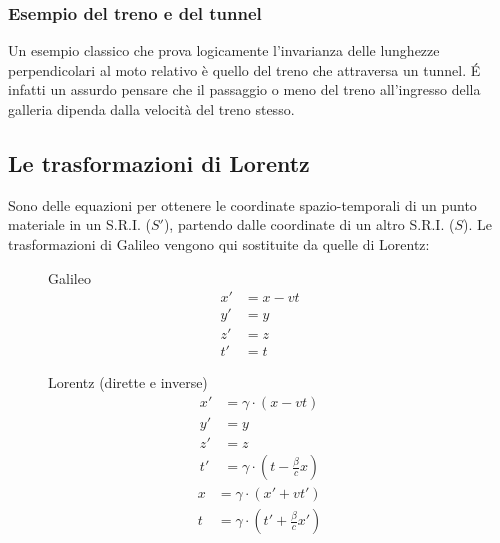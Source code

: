 \subsubsection{Esempio del treno e del tunnel}

Un esempio classico che prova logicamente l'invarianza delle lunghezze perpendicolari al moto relativo è quello del treno che attraversa un tunnel.
É infatti un assurdo pensare che il passaggio o meno del treno all'ingresso della galleria dipenda dalla velocità del treno stesso.

\subsection{Le trasformazioni di Lorentz}

Sono delle equazioni per ottenere le coordinate spazio-temporali di un punto materiale in un S.R.I. ($S'$), partendo dalle coordinate di un altro S.R.I. ($S$).
Le trasformazioni di Galileo vengono qui sostituite da quelle di Lorentz:

\begin{figure}[H]
    \begin{minipage}[t]{0.45\textwidth}
        \centering
        Galileo
        \begin{align*}
            x' & = x - vt \\
            y' & = y      \\
            z' & = z      \\
            t' & = t
        \end{align*}
    \end{minipage}
    \hfill
    \begin{minipage}[t]{0.45\textwidth}
        \centering
        Lorentz (dirette e inverse)
        \begin{align*}
            x' & = \gamma \cdot (x - vt)                             \\
            y' & = y                                                 \\
            z' & = z                                                 \\
            t' & = \gamma \cdot \left( t - \frac{\beta}{c} x \right)
        \end{align*}
        \begin{align*}
            x & = \gamma \cdot (x' + vt')                             \\
            t & = \gamma \cdot \left( t' + \frac{\beta}{c} x' \right)
        \end{align*}
    \end{minipage}
\end{figure}

